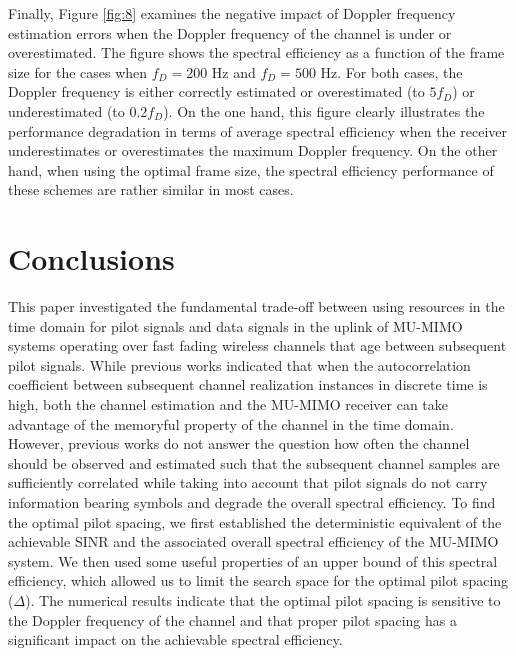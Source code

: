 \documentclass[conference, a4paper, 10pt]{IEEEtran}
\begin{document}
Finally, Figure \ref{fig:8} examines the negative impact of Doppler frequency estimation
errors when
the Doppler frequency of the channel is under or overestimated.
The figure shows the spectral efficiency as a function of the frame size for the cases when
$f_D=200$ Hz and $f_D=500$ Hz. For both cases, the Doppler frequency is either correctly estimated or overestimated (to $5f_D$) or underestimated (to $0.2 f_D$).
On the one hand, this figure clearly illustrates the performance degradation
in terms of average spectral efficiency when the receiver underestimates or overestimates
the maximum Doppler frequency.
On the other hand, when using the optimal frame size, the spectral efficiency performance
of these schemes are rather similar in most cases.

\section{Conclusions}
\label{Sec:Conc}
This paper investigated the fundamental trade-off between using resources in the time domain for pilot signals and data signals in the uplink of \ac{MU-MIMO} systems operating over fast fading wireless channels that age between subsequent pilot signals. While previous works indicated that when the autocorrelation coefficient between subsequent channel realization instances in discrete time is high, both the channel estimation and the \ac{MU-MIMO} receiver can take advantage of the memoryful property of the channel in the time domain. However, previous works do not answer the question how often the channel should be observed and estimated such that the subsequent channel samples are sufficiently correlated while
taking into account that pilot signals do not carry information bearing symbols and degrade the overall spectral efficiency.
To find the optimal pilot spacing, we first established the deterministic equivalent of the achievable \ac{SINR} and the associated overall spectral efficiency of the \ac{MU-MIMO} system. We then used some useful properties of an upper bound
of this spectral efficiency, which allowed us to limit the search space for the optimal pilot spacing ($\Delta$).
The numerical results indicate that the optimal pilot spacing is sensitive to the Doppler frequency of the channel and that proper pilot spacing has a significant impact on the achievable spectral efficiency.
\end{document}
